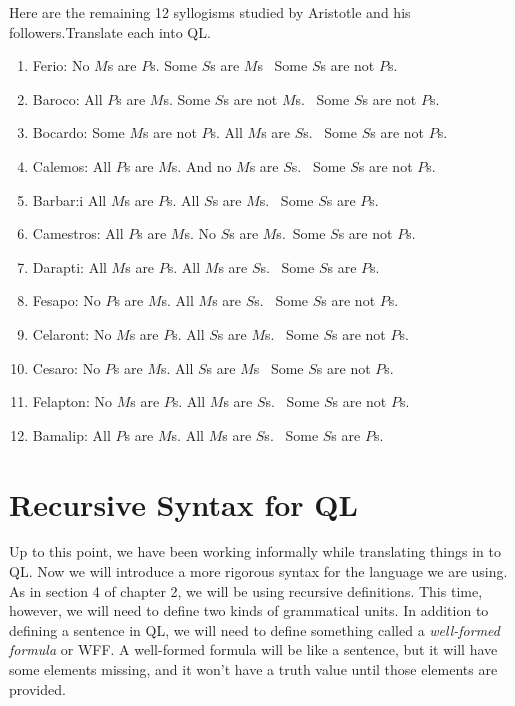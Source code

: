 \problempart
\label{pr.BarbaraEtc}
Here are the remaining 12 syllogisms studied by Aristotle and his followers.Translate each into QL.
\begin{enumerate}[label=\arabic*), topsep=0pt, parsep=0pt, itemsep=3pt]
\item Ferio: No $M$s are $P$s. Some $S$s are $M$s \therefore\   Some $S$s are not $P$s.  
\item Baroco: All $P$s are $M$s. Some $S$s are not $M$s. \therefore\   Some $S$s are not $P$s.  
\item Bocardo: Some $M$s are not $P$s. All $M$s are $S$s. \therefore\   Some $S$s are not $P$s.  
\item Calemos: All $P$s are $M$s. And no $M$s are $S$s. \therefore\   Some $S$s are not $P$s.  
\item Barbar:i All $M$s are $P$s. All $S$s are $M$s.	 \therefore\   Some $S$s are $P$s. 
\item Camestros: All $P$s are $M$s. No $S$s are $M$s.\therefore\   Some $S$s are not $P$s.  	
\item Darapti: All $M$s are $P$s. All $M$s are $S$s. \therefore\   Some $S$s are $P$s. 
\item Fesapo: No $P$s are $M$s. All $M$s are $S$s. \therefore\   Some $S$s are not $P$s.  
\item Celaront: No $M$s are $P$s. All $S$s are $M$s. \therefore\   Some $S$s are not $P$s.  
\item Cesaro: No $P$s are $M$s. All $S$s are $M$s \therefore\   Some $S$s are not $P$s.  
\item Felapton: No $M$s are $P$s. All $M$s are $S$s. \therefore\   Some $S$s are not $P$s.  
\item Bamalip: All $P$s are $M$s. All $M$s are $S$s. \therefore\   Some $S$s are $P$s. 
\end{enumerate}


\section{Recursive Syntax for QL}
\setlength{\parindent}{1em}
Up to this point, we have been working informally while translating things in to QL. Now we will introduce a more rigorous syntax for the language we are using. As in section 4 of chapter 2, we will be using recursive definitions. This time, however, we will need to define two kinds of grammatical units. In addition to defining a sentence in QL, we will need to define something called a \emph{well-formed formula} or WFF. A well-formed formula will be like a sentence, but it will have some elements missing, and it won't have a truth value until those elements are provided. 


